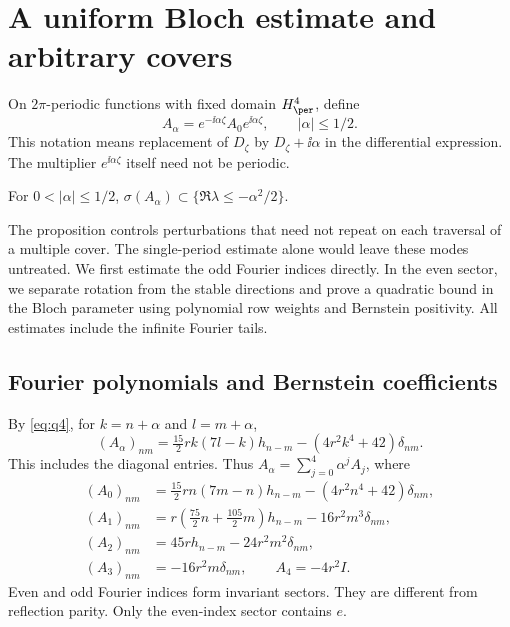 \section{A uniform Bloch estimate and arbitrary covers}\label{app:bloch}
On $2\pi$-periodic functions with fixed domain $H^4_\per$, define
\begin{equation}\label{eq:bloch-definition}
 A_\alpha=e^{-\ii\alpha\zeta}A_0e^{\ii\alpha\zeta},\qquad |\alpha|\le1/2.
\end{equation}
This notation means replacement of $D_\zeta$ by $D_\zeta+\ii\alpha$ in the differential expression. The multiplier $e^{\ii\alpha\zeta}$ itself need not be periodic.
\begin{proposition}\label{prop:bloch}
For $0<|\alpha|\le1/2$, $\sigma(A_\alpha)\subset\{\Re\lambda\le-\alpha^2/2\}$.
\end{proposition}
The proposition controls perturbations that need not repeat on each traversal of a multiple cover. The single-period estimate alone would leave these modes untreated. We first estimate the odd Fourier indices directly. In the even sector, we separate rotation from the stable directions and prove a quadratic bound in the Bloch parameter using polynomial row weights and Bernstein positivity. All estimates include the infinite Fourier tails.

\subsection{Fourier polynomials and Bernstein coefficients}
By \eqref{eq:q4}, for $k=n+\alpha$ and $l=m+\alpha$,
\begin{equation}\label{eq:bloch-simple}
 (A_\alpha)_{nm}=\tfrac{15}{2}r k(7l-k)h_{n-m}
 -(4r^2k^4+42)\delta_{nm}.
\end{equation}
This includes the diagonal entries. Thus $A_\alpha=\sum_{j=0}^4\alpha^jA_j$, where
\begin{equation}\label{eq:Aj}
\begin{aligned}
 (A_0)_{nm}&=\tfrac{15}{2}rn(7m-n)h_{n-m}-(4r^2n^4+42)\delta_{nm},\\
 (A_1)_{nm}&=r(\tfrac{75}{2}n+\tfrac{105}{2}m)h_{n-m}-16r^2m^3\delta_{nm},\\
 (A_2)_{nm}&=45rh_{n-m}-24r^2m^2\delta_{nm},\\
 (A_3)_{nm}&=-16r^2m\delta_{nm},\qquad A_4=-4r^2I.
\end{aligned}
\end{equation}
Even and odd Fourier indices form invariant sectors. They are different from reflection parity. Only the even-index sector contains $e$.


